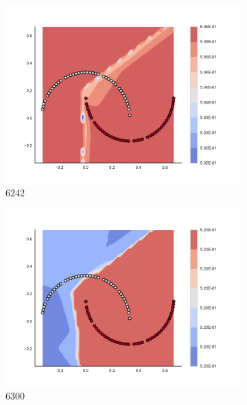 \begin{figure}[h]
\begin{subfigure}[b]{0.09\textwidth}
    \includegraphics[clip, trim=2.35cm 1.75cm 4.5cm 0cm,width=\textwidth]{img/convergence/6242.pdf}
    \caption{6242}
    \label{fig:convergence_6242}
\end{subfigure}
%
\begin{subfigure}[b]{0.09\textwidth}
    \includegraphics[clip, trim=2.35cm 1.75cm 4.5cm 0cm,width=\textwidth]{img/convergence/6300.pdf}
    \caption{6300}
    \label{fig:convergence_6300}
\end{subfigure}
%
\begin{subfigure}[b]{0.09\textwidth}

\end{subfigure}
\end{figure}
